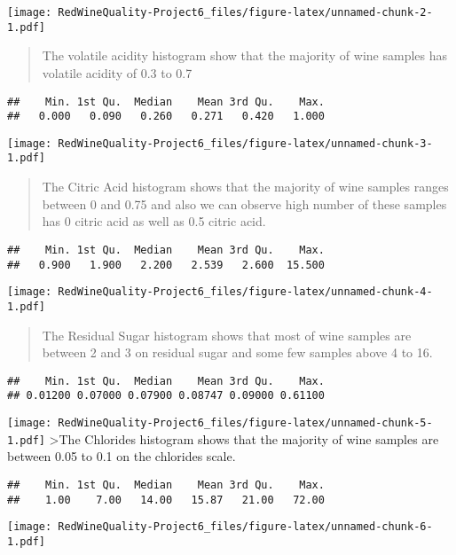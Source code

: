 \documentclass[]{article}
\begin{document}
\texttt{[image: RedWineQuality-Project6\_files/figure-latex/unnamed-chunk-2-1.pdf]}

\begin{quote}
The volatile acidity histogram show that the majority of wine samples
has volatile acidity of 0.3 to 0.7
\end{quote}

\begin{verbatim}
##    Min. 1st Qu.  Median    Mean 3rd Qu.    Max. 
##   0.000   0.090   0.260   0.271   0.420   1.000
\end{verbatim}

\texttt{[image: RedWineQuality-Project6\_files/figure-latex/unnamed-chunk-3-1.pdf]}

\begin{quote}
The Citric Acid histogram shows that the majority of wine samples ranges
between 0 and 0.75 and also we can observe high number of these samples
has 0 citric acid as well as 0.5 citric acid.
\end{quote}

\begin{verbatim}
##    Min. 1st Qu.  Median    Mean 3rd Qu.    Max. 
##   0.900   1.900   2.200   2.539   2.600  15.500
\end{verbatim}

\texttt{[image: RedWineQuality-Project6\_files/figure-latex/unnamed-chunk-4-1.pdf]}

\begin{quote}
The Residual Sugar histogram shows that most of wine samples are between
2 and 3 on residual sugar and some few samples above 4 to 16.
\end{quote}

\begin{verbatim}
##    Min. 1st Qu.  Median    Mean 3rd Qu.    Max. 
## 0.01200 0.07000 0.07900 0.08747 0.09000 0.61100
\end{verbatim}

\texttt{[image: RedWineQuality-Project6\_files/figure-latex/unnamed-chunk-5-1.pdf]}
\textgreater The Chlorides histogram shows that the majority of wine
samples are between 0.05 to 0.1 on the chlorides scale.

\begin{verbatim}
##    Min. 1st Qu.  Median    Mean 3rd Qu.    Max. 
##    1.00    7.00   14.00   15.87   21.00   72.00
\end{verbatim}

\texttt{[image: RedWineQuality-Project6\_files/figure-latex/unnamed-chunk-6-1.pdf]}
\end{document}
